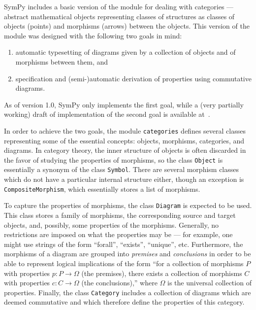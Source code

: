 SymPy includes a basic version of the module for dealing with categories ---
abstract mathematical objects representing classes of structures as classes of
objects (points) and morphisms (arrows) between the objects.  This version of
the module was designed with the following two goals in mind:

\begin{enumerate}
\item automatic typesetting of diagrams given by a collection of
  objects and of morphisms between them, and
\item specification and (semi-)automatic derivation of properties
  using commutative diagrams.
\end{enumerate}

As of version 1.0, SymPy only implements the first goal, while a (very partially
working) draft of implementation of the second goal is available
at~\cite{ct4commutativity}.

In order to achieve the two goals, the module \texttt{categories} defines
several classes representing some of the essential concepts: objects, morphisms,
categories, and diagrams.  In category theory, the inner structure of objects is
often discarded in the favor of studying the properties of morphisms, so the
class \texttt{Object} is essentially a synonym of the class \texttt{Symbol}.
There are several morphism classes which do not have a particular internal
structure either, though an exception is \texttt{CompositeMorphism}, which
essentially stores a list of morphisms.

To capture the properties of morphisms, the class \texttt{Diagram} is expected
to be used.  This class stores a family of morphisms, the corresponding source
and target objects, and, possibly, some properties of the morphisms.  Generally,
no restrictions are imposed on what the properties may be --- for example, one
might use strings of the form ``forall'', ``exists'', ``unique'', etc.
Furthermore, the morphisms of a diagram are grouped into \textit{premises} and
\textit{conclusions} in order to be able to represent logical implications of
the form ``for a collection of morphisms $P$ with properties $p:P\to \Omega$ (the
premises), there exists a collection of morphisms $C$ with properties $c:C\to
\Omega$ (the conclusions),'' where $\Omega$ is the universal collection of
properties.  Finally, the class \texttt{Category} includes a collection of
diagrams which are deemed commutative and which therefore define the properties
of this category.

